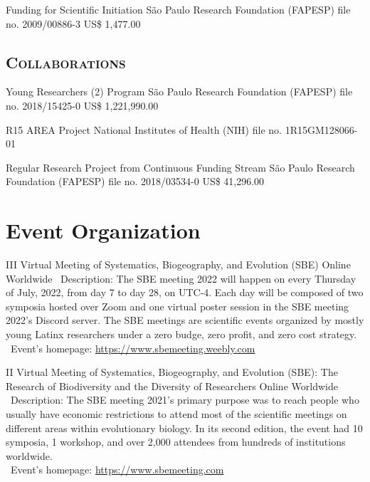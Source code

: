 \documentclass[11pt, letterpaper, sans]{moderncv}
\begin{document}
{Funding for Scientific Initiation}
{São Paulo Research Foundation (FAPESP)}
{file no. 2009/00886-3}
{US\$ 1,477.00}{}

\vspace{.5em}
	\subsection{\textsc{Collaborations}}
\vspace{.5em}

{Young Researchers (2) Program}
{São Paulo Research Foundation (FAPESP)}
{file no. 2018/15425-0}
{US\$ 1,221,990.00}{}

{R15 AREA Project}
{National Institutes of Health (NIH)}
{file no. 1R15GM128066-01}
{}{}

{Regular Research Project from Continuous Funding Stream}
{São Paulo Research Foundation (FAPESP)}
{file no. 2018/03534-0}
{US\$ 41,296.00}{}



\section{Event Organization}

	{III Virtual Meeting of Systematics, Biogeography, and Evolution (SBE)}
	{Online}
	{Worldwide}
	{}
	{
		\textbullet~Description: The SBE meeting 2022 will happen on every Thursday of July, 2022, from day 7 to day 28, on UTC-4. Each day will be composed of two symposia hosted over Zoom and one virtual poster session in the SBE meeting 2022's Discord server. The SBE meetings are scientific events organized by mostly young Latinx researchers under a zero budge, zero profit, and zero cost strategy.\\
		\textbullet~Event's homepage: \url{https://www.sbemeeting.weebly.com}
	}

	{II Virtual Meeting of Systematics, Biogeography, and Evolution (SBE): The Research of Biodiversity and the Diversity of Researchers}
	{Online}
	{Worldwide}
	{}
	{
		\textbullet~Description: The SBE meeting 2021's primary purpose was to reach people who usually have economic restrictions to attend most of the scientific meetings on different areas within evolutionary biology. In its second edition, the event had 10 symposia, 1 workshop, and over 2,000 attendees from hundreds of institutions worldwide.\\
		\textbullet~Event's homepage: \url{https://www.sbemeeting.com}
	}
\end{document}
